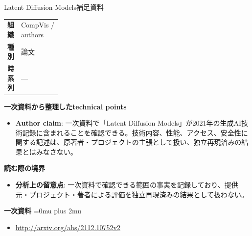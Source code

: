 \begin{technicalnote}{Latent Diffusion Models}{補足資料}
\begingroup
\begin{tabularx}{\linewidth}{@{}>{\bfseries}p{0.22\linewidth}X@{}}
組織 & CompVis / authors \\
種別 & 論文 \\
時系列 & — \\
\end{tabularx}
\smallskip
{\bfseries 一次資料から整理したtechnical points}
\begin{itemize}[leftmargin=1.5em,itemsep=0.35em]
\item \textbf{Author claim}: 一次資料で「Latent Diffusion Models」が2021年の生成AI技術記録に含まれることを確認できる。技術内容、性能、アクセス、安全性に関する記述は、原著者・プロジェクトの主張として扱い、独立再現済みの結果とはみなさない。
\end{itemize}
\begin{minipage}{\linewidth}
{\bfseries 読む際の境界}
\begin{itemize}[leftmargin=1.5em,itemsep=0.35em]
\item \textbf{分析上の留意点}: 一次資料で確認できる範囲の事実を記録しており、提供元・プロジェクト・著者による評価を独立再現済みの結果として扱わない。
\end{itemize}
\begin{samepage}
{\bfseries 一次資料}
\begingroup\sloppy
\Urlmuskip=0mu plus 2mu\relax
\begin{itemize}[leftmargin=1.5em,itemsep=0.25em]
\item {\scriptsize\url{http://arxiv.org/abs/2112.10752v2}}
\end{itemize}
\endgroup
\end{samepage}
\end{minipage}
\endgroup
\end{technicalnote}
\medskip

